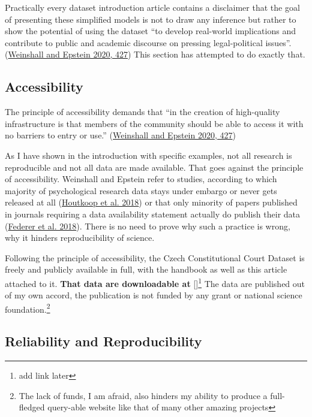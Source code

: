 \documentclass[
  11pt,
]{article}
\begin{document}
Practically every dataset introduction article contains a disclaimer
that the goal of presenting these simplified models is not to draw any
inference but rather to show the potential of using the dataset ``to
develop real-world implications and contribute to public and academic
discourse on pressing legal-political issues''.
(\protect\hyperlink{ref-weinshallDevelopingHighQualityData2020}{Weinshall
and Epstein 2020, 427}) This section has attempted to do exactly that.

\hypertarget{accessibility}{%
\subsection{Accessibility}\label{accessibility}}

The principle of accessibility demands that ``in the creation of
high-quality infrastructure is that members of the community should be
able to access it with no barriers to entry or use.''
(\protect\hyperlink{ref-weinshallDevelopingHighQualityData2020}{Weinshall
and Epstein 2020, 427})

As I have shown in the introduction with specific examples, not all
research is reproducible and not all data are made available. That goes
against the principle of accessibility. Weinshall and Epstein refer to
studies, according to which majority of psychological research data
stays under embargo or never gets released at all
(\protect\hyperlink{ref-houtkoopDataSharingPsychology2018}{Houtkoop et
al. 2018}) or that only minority of papers published in journals
requiring a data availability statement actually do publish their data
(\protect\hyperlink{ref-federerDataSharingPLOS2018}{Federer et al.
2018}). There is no need to prove why such a practice is wrong, why it
hinders reproducibility of science.

Following the principle of accessibility, the Czech Constitutional Court
Dataset is freely and publicly available in full, with the handbook as
well as this article attached to it. \textbf{That data are downloadable
at} {[}{]}\footnote{add link later} The data are published out of my own
accord, the publication is not funded by any grant or national science
foundation.\footnote{The lack of funds, I am afraid, also hinders my
  ability to produce a full-fledged query-able website like that of many
  other amazing projects}

\hypertarget{reliability-and-reproducibility}{%
\subsection{Reliability and
Reproducibility}\label{reliability-and-reproducibility}}
\end{document}
